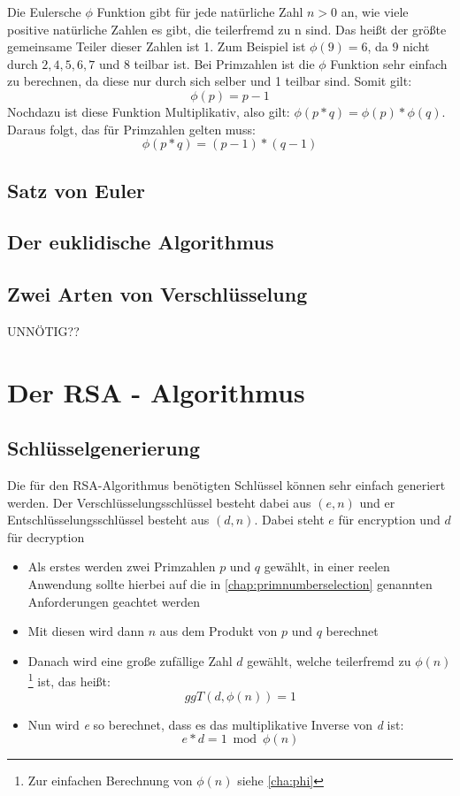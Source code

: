 \documentclass[12pt,a4paper]{scrartcl}
\begin{document}
	Die Eulersche $\phi$ Funktion gibt für jede natürliche Zahl ${n > 0}$ an, wie viele positive natürliche Zahlen es gibt, die teilerfremd zu n sind. Das heißt der größte gemeinsame Teiler dieser Zahlen ist 1. Zum Beispiel ist ${\phi(9) = 6}$, da ${9}$ nicht durch ${2, 4, 5, 6, 7 }$ und $8$ teilbar ist. Bei Primzahlen ist die $\phi$ Funktion sehr einfach zu berechnen, da diese nur durch sich selber und 1 teilbar sind. Somit gilt: $${\phi(p) = p - 1}$$
	Nochdazu ist diese Funktion Multiplikativ, also gilt: ${\phi(p * q) = \phi(p) * \phi(q)}$.
	Daraus folgt, das für Primzahlen gelten muss:
	$${\phi(p * q) = (p - 1) * (q - 1)}$$
	\subsection{Satz von Euler}
	\subsection{Der euklidische Algorithmus}
	\subsection{Zwei Arten von Verschlüsselung}
	UNNÖTIG??

\section{Der RSA - Algorithmus}
		
	\subsection{Schlüsselgenerierung}
Die für den RSA-Algorithmus benötigten Schlüssel können sehr einfach generiert werden. Der Verschlüsselungsschlüssel besteht dabei aus $(e, n)$ und er Entschlüsselungsschlüssel besteht aus $(d, n)$. Dabei steht $e$ für encryption und $d$ für decryption 
\begin{itemize}
\item Als erstes werden zwei Primzahlen $p$ und $q$ gewählt, in einer reelen Anwendung sollte hierbei auf die in \ref{chap:primnumberselection} genannten Anforderungen geachtet werden  
\item Mit diesen wird dann $n$ aus dem Produkt von $p$ und $q$ berechnet
\item Danach wird eine große zufällige Zahl $d$ gewählt, welche teilerfremd zu ${\phi(n)}$\footnote{Zur einfachen Berechnung von ${\phi(n)}$ siehe \ref{cha:phi}} ist, das heißt:
$${ggT(d, \phi(n)) = 1}$$ 
\item Nun wird \textit{e} so berechnet, dass es das multiplikative Inverse von \textit{d} ist:
$${e * d = 1 \bmod \phi(n)}$$
\end{itemize}
\end{document}
